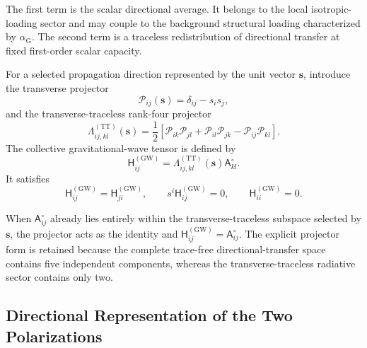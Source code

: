 The first term is the scalar directional average. It belongs to the local isotropic-loading sector and may couple to the background structural loading characterized by $\alpha_{\mathrm{G}}$. The second term is a traceless redistribution of directional transfer at fixed first-order scalar capacity.

For a selected propagation direction represented by the unit vector $\mathbf{s}$, introduce the transverse projector
\begin{equation}
    \mathcal{P}_{ij}(\mathbf{s}) = \delta_{ij}-s_{i}s_{j},
\end{equation}
and the transverse-traceless rank-four projector
\begin{equation}
    \Lambda_{ij,kl}^{(\mathrm{TT})}(\mathbf{s}) = \frac{1}{2} \left[ \mathcal{P}_{ik}\mathcal{P}_{jl} + \mathcal{P}_{il}\mathcal{P}_{jk} - \mathcal{P}_{ij}\mathcal{P}_{kl} \right].
\end{equation}
The collective gravitational-wave tensor is defined by
\begin{equation}
    \mathsf{H}_{ij}^{(\mathrm{GW})} = \Lambda_{ij,kl}^{(\mathrm{TT})}(\mathbf{s}) \mathsf{A}_{kl}^{\circ}.
\end{equation}
It satisfies
\begin{equation}
    \mathsf{H}_{ij}^{(\mathrm{GW})} = \mathsf{H}_{ji}^{(\mathrm{GW})}, \qquad s^{i}\mathsf{H}_{ij}^{(\mathrm{GW})} = 0, \qquad \mathsf{H}_{ii}^{(\mathrm{GW})} = 0.
\end{equation}

When $\mathsf{A}_{ij}^{\circ}$ already lies entirely within the transverse-traceless subspace selected by $\mathbf{s}$, the projector acts as the identity and $\mathsf{H}_{ij}^{(\mathrm{GW})} = \mathsf{A}_{ij}^{\circ}$. The explicit projector form is retained because the complete trace-free directional-transfer space contains five independent components, whereas the transverse-traceless radiative sector contains only two.

\subsection{Directional Representation of the Two Polarizations}
\label{subsec:directional_representation}

